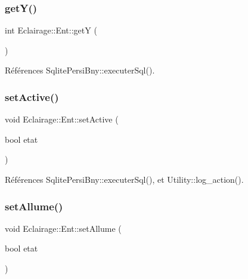 \mbox{\label{classEclairage_1_1Ent_a12a54fa5d966278eefc4b035142ade70}} 
\subsubsection{\texorpdfstring{get\+Y()}{getY()}}
{\footnotesize\ttfamily int Eclairage\+::\+Ent\+::getY (\begin{DoxyParamCaption}{ }\end{DoxyParamCaption})\hspace{0.3cm}{\ttfamily [virtual]}}



Références Sqlite\+Persi\+Bny\+::executer\+Sql().

\mbox{\label{classEclairage_1_1Ent_a1e9471a412f746a2284778c8d9548499}} 
\subsubsection{\texorpdfstring{set\+Active()}{setActive()}}
{\footnotesize\ttfamily void Eclairage\+::\+Ent\+::set\+Active (\begin{DoxyParamCaption}\item[{bool}]{etat }\end{DoxyParamCaption})\hspace{0.3cm}{\ttfamily [virtual]}}



Références Sqlite\+Persi\+Bny\+::executer\+Sql(), et Utility\+::log\+\_\+action().

\mbox{\label{classEclairage_1_1Ent_a3c9d21bd3c725857050e39eb449d1ad5}} 
\subsubsection{\texorpdfstring{set\+Allume()}{setAllume()}}
{\footnotesize\ttfamily void Eclairage\+::\+Ent\+::set\+Allume (\begin{DoxyParamCaption}\item[{bool}]{etat }\end{DoxyParamCaption})\hspace{0.3cm}{\ttfamily [virtual]}}



